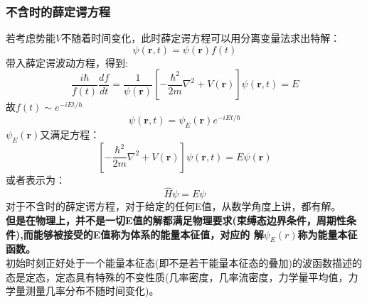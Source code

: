 \subsubsection{不含时的薛定谔方程}
若考虑势能$V$不随着时间变化，此时薛定谔方程可以用分离变量法求出特解：
$$\psi(\boldsymbol{r},t)=\psi(\boldsymbol{r})f(t)$$
带入薛定谔波动方程，得到:
$$
\frac{i\hbar}{f(t)}\frac{df}{dt}=
\frac{1}{\psi(\boldsymbol{r})}\left[-\frac{\hbar^2}{2m}\nabla^2 +V(\boldsymbol{r}) \right]\psi(\boldsymbol{r},t)=E 
$$
故$f(t)\sim e^{-iEt/\hbar}$
$$\psi(\boldsymbol{r},t)=\psi_E(\boldsymbol{r}) e^{-iEt/\hbar} $$
$\psi_E(\boldsymbol{r})$又满足方程：
$$\left[-\frac{\hbar^2}{2m}\nabla^2 +V(\boldsymbol{r}) \right]\psi(\boldsymbol{r},t)=E\psi(\boldsymbol{r})$$
或者表示为：
\begin{equation}
    \hat{H}\psi=E\psi
\end{equation}
对于不含时的薛定谔方程，对于给定的任何E值，从数学角度上讲，都有解。\\
\textbf{但是在物理上，并不是一切E值的解都满足物理要求(束缚态边界条件，周期性条件),而能够被接受的E值称为体系的能量本征值，对应的
解$\psi_E(r)$称为能量本征函数。}\\
初始时刻正好处于一个能量本征态(即不是若干能量本征态的叠加)的波函数描述的态是定态，定态具有特殊的不变性质(几率密度，几率流密度，力学量平均值，力学量测量几率分布不随时间变化)。